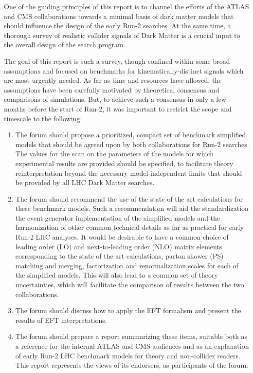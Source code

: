 One of the guiding principles of this report is to channel the efforts
of the ATLAS and CMS collaborations towards a minimal basis of dark
matter models that should influence the design of the early Run-2
searches. At the same time, a thorough survey of realistic collider
signals of Dark Matter is a crucial input to the overall design of the
search program.

The goal of this report is such a survey, though confined within some
broad assumptions and focused on benchmarks for kinematically-distinct
signals which are most urgently needed. As far as time and resources
have allowed, the assumptions have been carefully motivated by
theoretical consensus and comparisons of simulations. But, to achieve such a 
consensus in only a few months before the start of Run-2, it was
important to restrict the scope and timescale to the following:

\begin{enumerate}
\item The forum should propose a prioritized, compact set of benchmark
  simplified models that should be agreed upon by both collaborations for
  Run-2 searches. The values for the scan on the parameters of the models for which
  experimental results are provided should be specified, to facilitate theory reinterpretation 
  beyond the necessary model-independent limits that 
  should be provided by all LHC Dark Matter searches. 
\item The forum should recommend the use of the state of the art calculations
  for these benchmark models. Such a recommendation will aid the  
  standardization the event generator implementation
  of the simplified models and the harmonization of other common technical
  details as far as practical for early Run-2 LHC analyses. It
  would be desirable to have a common choice of leading order (LO) and 
  next-to-leading order (NLO) matrix elements corresponding to the state of the art calculations, 
  parton shower (PS) matching and merging, factorization and renormalization
  scales for each of the simplified models. This will also lead to a
  common set of theory uncertainties, which will facilitate the
  comparison of results between the two collaborations.
\item The forum should discuss how to apply the
  EFT formalism and present the results of EFT
  interpretations.
\item The forum should prepare a report summarizing these items,
  suitable both as a reference for the internal ATLAS and CMS
  audiences and as an explanation of early Run-2 LHC benchmark models for theory and non-collider
  readers. This report represents the views of its endorsers, as participants of the forum.
\end{enumerate}

